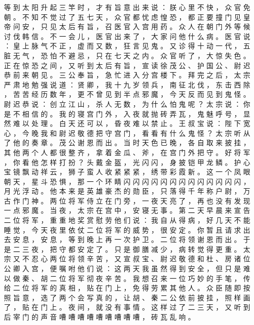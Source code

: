 {等 到 太 阳 升 起 三 竿 时 ， 才 有 旨 意 出 来 说 ： 朕 心 里 不 快 ， 众 官 免 朝 。
不 知 不 觉 过 了 五 七 天 ， 众 官 都 忧 虑 惶 恐 ， 都 正 要 撞 门 见 皇 帝 问 安 ， 只 见 太 后 有 旨 ， 召 医 官 入 宫 用 药 。
众 人 在 朝 门 外 等 候 讨 伐 韩 信 。
不 一 会 儿 ， 医 官 出 来 了 ， 大 家 问 他 什 么 病 。
医 官 说 ： 皇 上 脉 气 不 正 ， 虚 而 又 数 ， 狂 言 见 鬼 。
又 诊 得 十 动 一 代 ， 五 脏 无 气 ， 恐 怕 不 避 忌 ， 只 在 七 天 之 内 。
众 官 听 了 ， 大 惊 失 色 。
正 在 惊 恐 之 间 ， 又 听 到 太 后 有 旨 ， 宣 读 徐 茂 公 、 护 国 公 、 尉 迟 恭 前 来 朝 见 。
三 公 奉 旨 ， 急 忙 进 入 分 宫 楼 下 。
拜 完 之 后 ， 太 宗 严 肃 地 勉 强 说 道 ： 贤 卿 ， 我 十 九 岁 领 兵 ， 南 征 北 伐 ， 东 击 西 除 ， 苦 苦 经 历 数 年 ， 更 不 曾 见 到 半 点 邪 魔 ， 今 天 反 而 见 到 鬼 怪 。
尉 迟 恭 说 ： 创 立 江 山 ， 杀 人 无 数 ， 为 什 么 怕 鬼 呢 ？ 太 宗 说 ： 你 是 不 相 信 的 。
我 的 寝 宫 门 外 ， 入 夜 就 抛 砖 弄 瓦 ， 鬼 魅 呼 号 ， 显 然 难 以 处 理 。
白 天 还 可 以 ， 昏 夜 难 以 禁 止 。
王 叔 宝 说 ： 陛 下 宽 心 ， 今 晚 我 和 尉 迟 敬 德 把 守 宫 门 ， 看 看 有 什 么 鬼 怪 ？
太 宗 听 从 了 他 的 奏 章 。
茂 公 谢 恩 而 出 。
当 时 天 色 已 晚 ， 各 自 取 来 披 挂 ， 其 他 两 个 人 都 很 整 齐 ， 拿 着 金 瓜 、 斧 ， 在 宫 门 外 把 守 。
好 将 军 ， 你 看 他 怎 样 打 扮 ？ 头 戴 金 盔 ， 光 闪 闪 ， 身 披 铠 甲 龙 鳞 。
护 心 宝 镜 飘 动 祥 云 ， 狮 子 蛮 人 收 紧 紧 紧 ， 绣 带 彩 霞 新 。
这 一 个 凤 眼 朝 天 ， 星 斗 恐 惧 ， 那 一 个 环 睛 闪 闪 闪 闪 闪 闪 闪 闪 闪 闪 闪 闪 闪 ， 月 光 浮 动 。
他 本 来 是 英 雄 豪 杰 的 勋 臣 ， 只 落 得 千 年 称 户 尉 ， 万 古 作 门 神 。
两 位 将 军 侍 立 在 门 旁 ， 一 夜 天 亮 了 ， 再 也 没 有 发 现 一 点 邪 魔 。
当 夜 ， 太 宗 在 宫 中 ， 安 寝 无 事 。
第 二 天 早 晨 来 宣 告 二 位 将 军 ， 重 重 地 奖 赏 慰 劳 他 们 说 ： 我 自 从 得 病 ， 好 几 天 不 能 睡 觉 ， 今 天 夜 里 依 仗 二 位 将 军 的 威 势 ， 很 安 定 。
你 暂 且 请 求 出 去 安 息 ， 安 息 ， 等 到 晚 上 再 一 次 护 卫 。
二 位 将 领 谢 恩 而 出 。
于 是 二 三 夜 ， 把 守 都 安 定 了 。
只 是 御 膳 减 少 ， 病 转 觉 得 更 重 。
太 宗 又 不 忍 心 两 位 将 领 辛 苦 ， 又 宣 叔 宝 、 尉 迟 敬 德 和 杜 、 房 诸 位 公 卿 入 宫 ， 便 嘱 咐 他 们 说 ： 这 两 天 我 虽 然 得 到 安 全 ， 但 只 是 难 以 做 秦 、 胡 二 位 将 军 彻 夜 辛 苦 。
我 想 召 来 一 位 巧 妙 的 手 笔 ， 传 给 二 位 将 军 的 真 相 ， 贴 在 门 上 ， 免 得 劳 累 其 他 人 。
众 臣 随 即 按 照 旨 意 ， 选 了 两 个 会 写 真 的 ， 让 胡 、 秦 二 公 依 前 披 挂 ， 照 样 画 了 ， 贴 在 门 上 。
夜 间 ， 就 没 有 事 情 。
这 样 过 了 二 三 天 ， 又 听 到 后 宰 门 的 声 音 嘈 嘈 嘈 嘈 嘈 嘈 嘈 嘈 嘈 ， 砖 瓦 乱 响 。
}
